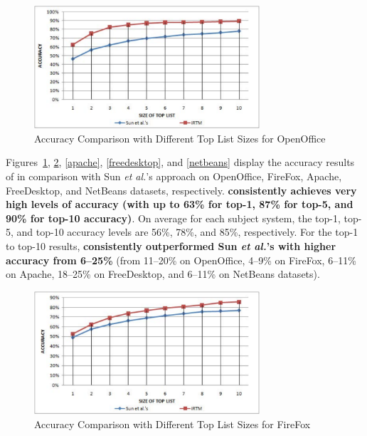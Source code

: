 \begin{figure}[t]
\centering
\includegraphics[width=3.3in]{openoffice}
\caption{Accuracy Comparison with Different Top List Sizes for OpenOffice}
\label{openoffice}
\end{figure}


Figures~\ref{openoffice}, \ref{firefox}, \ref{apache},
\ref{freedesktop}, and \ref{netbeans} display the accuracy results of
    {\model} in comparison with Sun {\em et al.}'s approach on
    OpenOffice, FireFox, Apache, FreeDesktop, and NetBeans datasets,
    respectively. {\bf {\model} consistently achieves very high levels
      of accuracy (with up to 63\% for top-1, 87\% for top-5, and 90\%
      for top-10 accuracy)}. On average for each subject system, the
    top-1, top-5, and top-10 accuracy levels are 56\%, 78\%, and 85\%,
    respectively. For the top-1 to top-10 results, {\bf {\model}
      consistently outperformed Sun {\em et al.}'s with higher
      accuracy from 6--25\%} (from 11--20\% on OpenOffice, 4--9\% on
      FireFox, 6--11\% on Apache, 18--25\% on FreeDesktop, and
      6--11\% on NetBeans datasets).



\begin{figure}[t]
\centering
\includegraphics[width=3.3in]{firefox2}
\caption{Accuracy Comparison with Different Top List Sizes for FireFox}
\label{firefox}
\end{figure}

